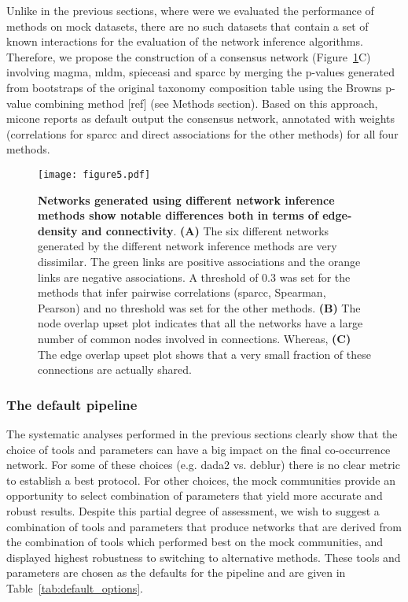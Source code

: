   Unlike in the previous sections, where were we evaluated the performance of methods on mock datasets, there are no such datasets that contain a set of known interactions for the evaluation of the network inference algorithms.
  Therefore, we propose the construction of a consensus network (Figure~\ref{fig:figure5}C) involving \ac{magma}, \ac{mldm}, \ac{spieceasi} and \ac{sparcc} by merging the p-values generated from bootstraps of the original taxonomy composition table using the Browns p-value combining method [ref] (see Methods section).
  Based on this approach, \ac{micone} reports as default output the consensus network, annotated with weights (correlations for \ac{sparcc} and direct associations for the other methods) for all four methods.

  \begin{figure}[H]
    \centering
    \texttt{[image: figure5.pdf]}
  \end{figure}
  \begin{figure}[t!]
    \centering
    \caption{
      \textbf{Networks generated using different network inference methods show notable differences both in terms of edge-density and connectivity}.
      \textbf{(A)} The six different networks generated by the different network inference methods are very dissimilar.
      The green links are positive associations and the orange links are negative associations.
      A threshold of 0.3 was set for the methods that infer pairwise correlations (\ac{sparcc}, Spearman, Pearson) and no threshold was set for the other methods.
      \textbf{(B)} The node overlap upset plot indicates that all the networks have a large number of common nodes involved in connections.
      Whereas, \textbf{(C)} The edge overlap upset plot shows that a very small fraction of these connections are actually shared.
    }
    \label{fig:figure5}
  \end{figure}

 

  \FloatBarrier

  \subsubsection*{The default pipeline}
  
  The systematic analyses performed in the previous sections clearly show that the choice of tools and parameters can have a big impact on the final co-occurrence network. For some of these choices (e.g. \ac{dada2} vs. deblur) there is no clear metric to establish a best protocol.
  For other choices, the mock communities provide an opportunity to select combination of parameters that yield more accurate and robust results.
  Despite this partial degree of assessment, we wish to suggest a combination of tools and parameters that produce networks that are derived from the combination of tools which performed best on the mock communities, and displayed highest robustness to switching to alternative methods.
  These tools and parameters are chosen as the defaults for the pipeline and are given in Table~\ref{tab:default_options}.

